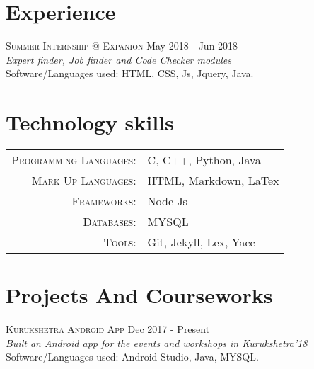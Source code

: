 \documentclass[a4paper,10pt]{article}
\begin{document}
\section{Experience}
{\textsc{Summer Internship @ Expanion} \hfill May 2018 - Jun 2018 \\
\emph{Expert finder, Job finder and Code Checker modules}\\  
Software/Languages used: HTML, CSS, Js, Jquery, Java.} \\

\section{Technology skills}
\begin{tabular}{rl}
 \textsc{Programming Languages:}& C, C++, Python, Java\\
\textsc{Mark Up Languages:}& HTML, Markdown, LaTex\\
\textsc{Frameworks:}& Node Js\\
\textsc{Databases:}& MYSQL\\
\textsc{Tools:}& Git, Jekyll, Lex, Yacc\\
\end{tabular}

\section{Projects And Courseworks}
{\textsc{ Kurukshetra Android App} \hfill Dec 2017 - Present \\
\emph{Built an Android app for the events and workshops in Kurukshetra'18}\\  
Software/Languages used: Android Studio, Java, MYSQL.} \\
\end{document}
